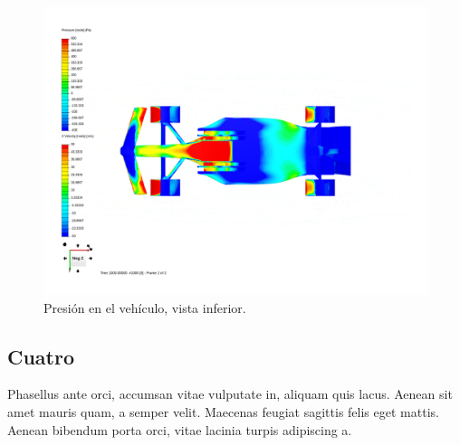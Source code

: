 \documentclass[colTwo]{NanouparIEEE}
\begin{document}
            \begin{figure}[htbp]
                \centerline{\includegraphics[scale=0.18]{images/Image_3-Inferior.png}}
                \caption{Presión en el vehículo, vista inferior.}
                \label{Fig.comportamiento_de_la_presion_inferior_vehiculo}
            \end{figure}

        \subsection{Cuatro}
            Phasellus ante orci, accumsan vitae vulputate in, aliquam quis lacus. Aenean sit amet mauris quam, a semper velit. Maecenas feugiat sagittis felis eget mattis. Aenean bibendum porta orci, vitae lacinia turpis adipiscing a. 
\end{document}
